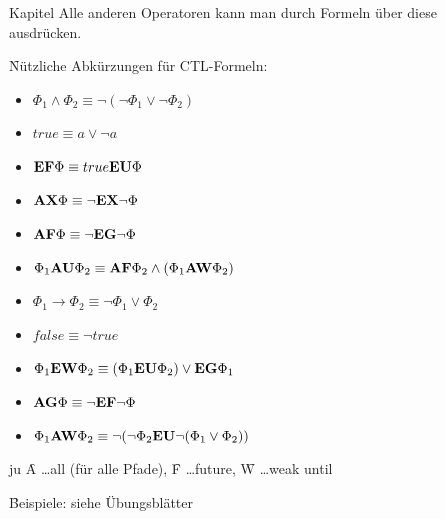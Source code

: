 \begin{chapter}{Kapitel}
\noindent Alle anderen Operatoren kann man durch Formeln über diese ausdrücken. 
\vspace*{5pt}

\f{Nützliche Abkürzungen für CTL-Formeln}:
\begin{itemize}
 \item $\Phi_1\wedge\Phi_2 \equiv \neg(\neg\Phi_1\vee\neg\Phi_2)$
 \item $true \equiv a\vee\neg a$
 \item $\f{EF}\Phi \equiv true\f{EU}\Phi$
 \item $\f{AX}\Phi \equiv \neg\f{EX}\neg\Phi$
 \item $\f{AF}\Phi \equiv \neg\f{EG}\neg\Phi$
 \item $\Phi_1\f{AU}\Phi_2 \equiv \f{AF}\Phi_2 \wedge (\Phi_1\f{AW}\Phi_2)$
 \item $\Phi_1 \rightarrow \Phi_2 \equiv \neg\Phi_1\vee\Phi_2$
 \item $false \equiv \neg true$
 \item $\Phi_1\f{EW}\Phi_2 \equiv (\Phi_1\f{EU}\Phi_2)\vee\f{EG}\Phi_1$
 \item $\f{AG}\Phi \equiv \neg\f{EF}\neg\Phi$
 \item $\Phi_1\f{AW}\Phi_2 \equiv \neg(\neg\Phi_2\f{EU}\neg(\Phi_1\vee\Phi_2))$
\end{itemize}ju
\f{A} \dots all (für alle Pfade), \f{F} \dots future, \f{W} \dots weak until
\vspace*{5pt}

\f{Beispiele: siehe Übungsblätter}

\end{chapter}
